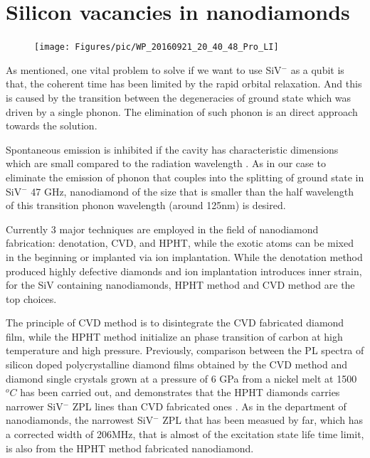 
\section[Silicon vacancies in nanodiamonds]{Silicon vacancies in nanodiamonds}
\begin{figure}[h]
\centering
\texttt{[image: Figures/pic/WP\_20160921\_20\_40\_48\_Pro\_LI]}
\caption{}
\label{fig:wp20160921204048proli}
\end{figure}
As mentioned, one vital problem to solve if we want to use SiV$^{-}$ as a qubit is that, the coherent time has been limited by the rapid orbital relaxation. And this is caused by the transition between the degeneracies of ground state which was driven by a single phonon. The elimination of such phonon is an direct approach towards the solution.

Spontaneous emission is inhibited if the cavity has characteristic dimensions which are small compared to the radiation wavelength \citep{kleppner_inhibited_1981}. As in our case to eliminate the emission of phonon that couples into the splitting of ground state in SiV$^{-}$ 47 GHz, nanodiamond of the size that is smaller than the half wavelength of this transition phonon wavelength (around 125nm) is desired. 

Currently 3 major techniques are employed in the field of nanodiamond fabrication: denotation, CVD, and HPHT, while the exotic atoms can be mixed in the beginning or implanted via ion implantation. While the denotation method produced highly defective diamonds and ion implantation introduces inner strain, for the SiV containing nanodiamonds, HPHT method and CVD method are the top choices.

The principle of CVD method is to disintegrate the CVD fabricated diamond film, while the HPHT method initialize an phase transition of carbon at high temperature and high pressure. Previously, comparison between the PL spectra of silicon doped polycrystalline diamond films obtained by the CVD method and diamond single crystals grown at a pressure of 6 GPa from a nickel melt at 1500$^{o}C$ has been carried out, and demonstrates that the HPHT diamonds carries narrower SiV$^{-}$ ZPL lines than CVD fabricated ones \citep{clark_silicon_1995}. As in the department of nanodiamonds, the narrowest SiV$^{-}$ ZPL that has been measued by far, which has a corrected width of 206MHz, that is almost of the excitation state life time limit, is also from the HPHT method fabricated nanodiamond.

